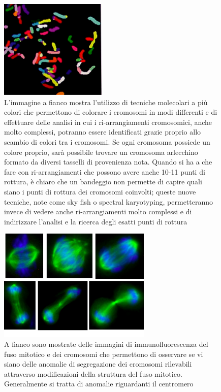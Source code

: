 \documentclass[11pt]{book}
\begin{document}
\begin{figure}[h!]
\centering
\includegraphics[scale=0.80]{img/18.png}
\caption{L’immagine a fianco mostra l’utilizzo di tecniche molecolari a più colori che permettono di colorare i cromosomi in modi differenti e di effettuare delle analisi in cui i ri-arrangiamenti cromosomici, anche molto complessi, potranno essere identificati grazie proprio allo scambio di colori tra i cromosomi. 
Se ogni cromosoma possiede un colore proprio, sarà possibile trovare un cromosoma arlecchino formato da diversi tasselli di provenienza nota. 
Quando si ha a che fare con ri-arrangiamenti che possono avere anche 10-11 punti di rottura, è chiaro che un bandeggio non permette di capire quali siano i punti di rottura dei cromosomi coinvolti; queste nuove tecniche, note come sky fish o spectral karyotyping, permetteranno invece di vedere anche ri-arrangiamenti molto complessi e di indirizzare l’analisi e la ricerca degli esatti punti di rottura}
\label{}
\end{figure}

\begin{figure}[h!]
\centering
\includegraphics[scale=0.70]{img/19.png}
\caption{A fianco sono mostrate delle immagini di immunofluorescenza del fuso mitotico e dei cromosomi che permettono di osservare se vi siano delle anomalie di segregazione dei cromosomi rilevabili attraverso modificazioni della struttura del fuso mitotico. 
Generalmente si tratta di anomalie riguardanti il centromero}
\label{}
\end{figure}
\end{document}
